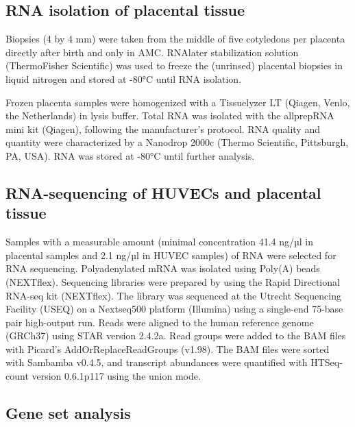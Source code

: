 \documentclass[authordate, empirical]{jote-new-article}
\begin{document}
	\subsection{RNA isolation of placental tissue}



	Biopsies (4 by 4 mm) were taken from the middle of five cotyledons per placenta directly after birth and only in AMC. RNAlater stabilization solution (ThermoFisher Scientific) was used to freeze the (unrinsed) placental biopsies in liquid nitrogen and stored at -80°C until RNA isolation.

	Frozen placenta samples were homogenized with a Tissuelyzer LT (Qiagen, Venlo, the Netherlands) in lysis buffer. Total RNA was isolated with the allprepRNA mini kit (Qiagen), following the manufacturer's protocol. RNA quality and quantity were characterized by a Nanodrop 2000c (Thermo Scientific, Pittsburgh, PA, USA). RNA was stored at -80°C until further analysis.







	\subsection{RNA-sequencing of HUVECs and placental tissue}



	Samples with a measurable amount (minimal concentration 41.4 ng/µl in placental samples and 2.1 ng/µl in HUVEC samples) of RNA were selected for RNA sequencing. Polyadenylated mRNA was isolated using Poly(A) beads (NEXTflex). Sequencing libraries were prepared by using the Rapid Directional RNA-seq kit (NEXTflex). The library was sequenced at the Utrecht Sequencing Facility (USEQ) on a Nextseq500 platform (Illumina) using a single-end 75-base pair high-output run. Reads were aligned to the human reference genome (GRCh37) using STAR version 2.4.2a. Read groups were added to the BAM files with Picard's AddOrReplaceReadGroups (v1.98). The BAM files were sorted with Sambamba v0.4.5, and transcript abundances were quantified with HTSeq-count version 0.6.1p117 using the union mode.







	\subsection{Gene set analysis }
\end{document}
